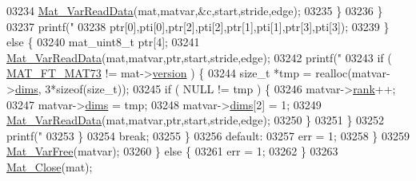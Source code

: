 \begin{DoxyCode}
{{{{{{{{{{{{{{{{{{{{{{{{{{{{{{{{{{{{{{{{{{{{{{{{{{{{{{{{{03234                                 \hyperlink{group___m_a_t_ga1845000f4fc6252ec5ff11c4b9f0759f}{Mat\_VarReadData}(mat,matvar,&c,start,stride,edge);
03235                             \}
03236                         \}
03237                         printf(\textcolor{stringliteral}{"%
03238                             ptr[0],pti[0],ptr[2],pti[2],ptr[1],pti[1],ptr[3],pti[3]);
03239                     \} \textcolor{keywordflow}{else} \{
03240                         mat\_uint8\_t ptr[4];
03241                         \hyperlink{group___m_a_t_ga1845000f4fc6252ec5ff11c4b9f0759f}{Mat\_VarReadData}(mat,matvar,ptr,start,stride,edge);
03242                         printf(\textcolor{stringliteral}{"%
03243                         \textcolor{keywordflow}{if} ( \hyperlink{group___m_a_t_ggad03442b8378999189d510e3745c702b7a765c5d1d5038947646260dc82483517e}{MAT\_FT\_MAT73} != mat->\hyperlink{struct__mat__t_a729c2bc0afc97485057a5af425635b1a}{version} ) \{
03244                             \textcolor{keywordtype}{size\_t} *tmp = realloc(matvar->\hyperlink{group___m_a_t_a8e01234e1c862ce3472bb37f5a09b92c}{dims}, 3*\textcolor{keyword}{sizeof}(\textcolor{keywordtype}{size\_t}));
03245                             \textcolor{keywordflow}{if} ( NULL != tmp ) \{
03246                                 matvar->\hyperlink{group___m_a_t_a84ba70c96ded13cc555fa75b768d9921}{rank}++;
03247                                 matvar->\hyperlink{group___m_a_t_a8e01234e1c862ce3472bb37f5a09b92c}{dims} = tmp;
03248                                 matvar->\hyperlink{group___m_a_t_a8e01234e1c862ce3472bb37f5a09b92c}{dims}[2] = 1;
03249                                 \hyperlink{group___m_a_t_ga1845000f4fc6252ec5ff11c4b9f0759f}{Mat\_VarReadData}(mat,matvar,ptr,start,stride,edge);
03250                             \}
03251                         \}
03252                         printf(\textcolor{stringliteral}{"%
03253                     \}
03254                     \textcolor{keywordflow}{break};
03255                 \}
03256                 \textcolor{keywordflow}{default}:
03257                     err = 1;
03258             \}
03259             \hyperlink{group___m_a_t_ga1d14716f7450530fd1c9d02413787f0e}{Mat\_VarFree}(matvar);
03260         \} \textcolor{keywordflow}{else} \{
03261             err = 1;
03262         \}
03263         \hyperlink{group___m_a_t_ga101c92ff7bde4a2d4615661beba09262}{Mat\_Close}(mat);
}}}}}}}}}}}}}}}}}}}}}}}}}}}}}}}}}}}}}}}}}}}}}}}}}}}}}}}}}}}}
\end{DoxyCode}
